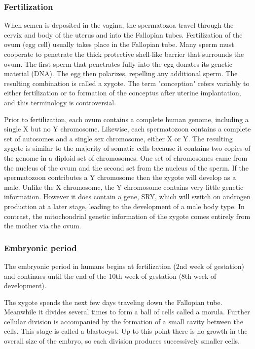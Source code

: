 \documentclass[12pt,a4paper,onecolumn]{article}
\begin{document}
\subsubsection{Fertilization}

\begin{figwindow}
When semen is deposited in the vagina, the spermatozoa travel through the cervix and body of the
uterus and into the Fallopian tubes. Fertilization of the ovum (egg cell) usually takes place in the
Fallopian tube. Many sperm must cooperate to penetrate the thick protective shell-like barrier that
surrounds the ovum. The first sperm that penetrates fully into the egg donates its genetic material
(DNA). The egg then polarizes, repelling any additional sperm. The resulting combination is called a
zygote. The term "conception" refers variably to either fertilization or to formation of the
conceptus after uterine implantation, and this terminology is controversial.
\end{figwindow}

Prior to fertilization, each ovum contains a complete human genome, including a single X but no Y
chromosome. Likewise, each spermatozoon contains a complete set of autosomes and a single sex
chromosome, either X or Y. The resulting zygote is similar to the majority of somatic cells because
it contains two copies of the genome in a diploid set of chromosomes. One set of chromosomes came
from the nucleus of the ovum and the second set from the nucleus of the sperm. If the spermatozoon
contributes a Y chromosome then the zygote will develop as a male. Unlike the X chromosome, the Y
chromosome contains very little genetic information. However it does contain a gene, SRY, which will
switch on androgen production at a later stage, leading to the development of a male body type. In
contrast, the mitochondrial genetic information of the zygote comes entirely from the mother via the
ovum.


\subsubsection{Embryonic period}

The embryonic period in humans begins at fertilization (2nd week of gestation) and continues until
the end of the 10th week of gestation (8th week of development).

The zygote spends the next few days traveling down the Fallopian tube. Meanwhile it divides several
times to form a ball of cells called a morula. Further cellular division is accompanied by the
formation of a small cavity between the cells. This stage is called a blastocyst. Up to this point
there is no growth in the overall size of the embryo, so each division produces successively smaller
cells.
\end{document}
